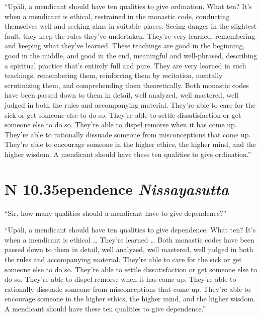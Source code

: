 \documentclass[12pt,openany]{book}%
\newcommand*{\suttatitleacronym}[1]{\smaller[2]{#1}\vspace*{.3em}}
\newcommand*{\suttatitletranslation}[1]{\linebreak{#1}}
\newcommand*{\suttatitleroot}[1]{\linebreak\smaller[2]\itshape{#1}}
\newcommand*{\tocacronym}[1]{\hspace*{-3.3em}{#1}\quad}
\newcommand*{\toctranslation}[1]{#1}
\newcommand*{\tocroot}[1]{(\textit{#1})}
\begin{document}
“\textsanskrit{Upāli}, a mendicant should have ten qualities to give ordination. What ten? It’s when a mendicant is ethical, restrained in the monastic code, conducting themselves well and seeking alms in suitable places. Seeing danger in the slightest fault, they keep the rules they’ve undertaken. They’re very learned, remembering and keeping what they’ve learned. These teachings are good in the beginning, good in the middle, and good in the end, meaningful and well-phrased, describing a spiritual practice that’s entirely full and pure. They are very learned in such teachings, remembering them, reinforcing them by recitation, mentally scrutinizing them, and comprehending them theoretically. Both monastic codes have been passed down to them in detail, well analyzed, well mastered, well judged in both the rules and accompanying material. They’re able to care for the sick or get someone else to do so. They’re able to settle dissatisfaction or get someone else to do so. They’re able to dispel remorse when it has come up. They’re able to rationally dissuade someone from misconceptions that come up. They’re able to encourage someone in the higher ethics, the higher mind, and the higher wisdom. A mendicant should have these ten qualities to give ordination.” 

%
\section*{{\suttatitleacronym AN 10.35}{\suttatitletranslation Dependence }{\suttatitleroot Nissayasutta}}
\addcontentsline{toc}{section}{\tocacronym{AN 10.35} \toctranslation{Dependence } \tocroot{Nissayasutta}}

“Sir, how many qualities should a mendicant have to give dependence?” 

“\textsanskrit{Upāli}, a mendicant should have ten qualities to give dependence. What ten? It’s when a mendicant is ethical … They’re learned … Both monastic codes have been passed down to them in detail, well analyzed, well mastered, well judged in both the rules and accompanying material. They’re able to care for the sick or get someone else to do so. They’re able to settle dissatisfaction or get someone else to do so. They’re able to dispel remorse when it has come up. They’re able to rationally dissuade someone from misconceptions that come up. They’re able to encourage someone in the higher ethics, the higher mind, and the higher wisdom. A mendicant should have these ten qualities to give dependence.” 
\end{document}
